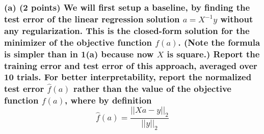 \documentclass[11pt]{article}
\begin{document}
    \subsubsection{\texorpdfstring{(a) (2 points) We will first setup a
baseline, by finding the test error of the linear regression solution
\(a=X^{-1}y\) without any regularization. This is the closed-form
solution for the minimizer of the objective function \(f(a)\). (Note the
formula is simpler than in 1(a) because now \(X\) is square.) Report the
training error and test error of this approach, averaged over 10 trials.
For better interpretability, report the normalized test error
\(\hat{f}(a)\) rather than the value of the objective function \(f(a)\),
where by definition
\[ \hat{f}(a) = \frac{||Xa-y||_2}{||y||_2}　\]}{(a) (2 points) We will first setup a baseline, by finding the test error of the linear regression solution a=X\^{}\{-1\}y without any regularization. This is the closed-form solution for the minimizer of the objective function f(a). (Note the formula is simpler than in 1(a) because now X is square.) Report the training error and test error of this approach, averaged over 10 trials. For better interpretability, report the normalized test error \textbackslash{}hat\{f\}(a) rather than the value of the objective function f(a), where by definition  \textbackslash{}hat\{f\}(a) = \textbackslash{}frac\{\textbar{}\textbar{}Xa-y\textbar{}\textbar{}\_2\}\{\textbar{}\textbar{}y\textbar{}\textbar{}\_2\}　}}\label{a-2-points-we-will-first-setup-a-baseline-by-finding-the-test-error-of-the-linear-regression-solution-ax-1y-without-any-regularization.-this-is-the-closed-form-solution-for-the-minimizer-of-the-objective-function-fa.-note-the-formula-is-simpler-than-in-1a-because-now-x-is-square.-report-the-training-error-and-test-error-of-this-approach-averaged-over-10-trials.-for-better-interpretability-report-the-normalized-test-error-hatfa-rather-than-the-value-of-the-objective-function-fa-where-by-definition-hatfa-fracxa-y_2y_2}
\end{document}
